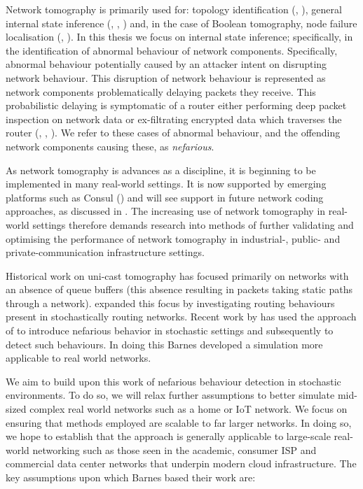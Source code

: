 Network tomography is primarily used for: topology identification (\cite{zhang_topology_2014}, \cite{hailiang_network_2009}), general internal state inference (\cite{vardi_network_1996}, \cite{coates_network_2001}, \cite{he_network_2021}) and, in the case of Boolean tomography, node failure localisation (\cite{nguyen_boolean_2007}, \cite{ma_optimal_2015}). In this thesis we focus on internal state inference; specifically, in the identification of abnormal behaviour of network components. Specifically, abnormal behaviour potentially caused by an attacker intent on disrupting network behaviour. This disruption of network behaviour is represented as network components problematically delaying packets they receive. This probabilistic delaying is symptomatic of a router either performing deep packet inspection on network data or ex-filtrating encrypted data which traverses the router (\cite{potteiger_evaluating_2017}, \cite{ullah_data_2018}, \cite{dorazio_data_2017}). We refer to these cases of abnormal behaviour, and the offending network components causing these, as \textit{nefarious}.\par
As network tomography is advances as a discipline, it is beginning to be implemented in many real-world settings. It is now supported by emerging platforms such as Consul (\cite{shilton_network_2021}) and will see support in future network coding approaches, as discussed in \cite{kakkavas_review_2020}. The increasing use of network tomography in real-world settings therefore demands research into methods of further validating and optimising the performance of network tomography in industrial-, public- and private-communication infrastructure settings.\par
Historical work on uni-cast tomography has focused primarily on networks with an absence of queue buffers (this absence resulting in packets taking static paths through a network). \cite{lai_measuring_2000} expanded this focus by investigating routing behaviours present in stochastically routing networks. Recent work by \cite{barnes_stochastic_2020} has used the approach of \cite{lai_measuring_2000} to introduce nefarious behavior in stochastic settings and subsequently to detect such behaviours. In doing this Barnes developed a simulation more applicable to real world networks.\par
We aim to build upon this work of nefarious behaviour detection in stochastic environments. To do so, we will relax further assumptions to better simulate mid-sized complex real world networks such as a home or IoT network. We focus on ensuring that methods employed are scalable to far larger networks. In doing so, we hope to establish that the approach is generally applicable to large-scale real-world networking such as those seen in the academic, consumer ISP and commercial data center networks that underpin modern cloud infrastructure. The key assumptions upon which Barnes based their work are:\par
